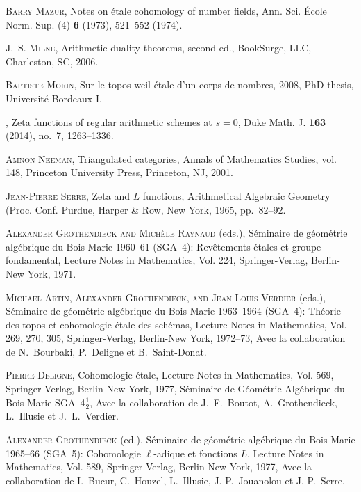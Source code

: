 \documentclass[leqno,12pt]{article}
\theoremstyle{plain}
\theoremstyle{definition}
\begin{document}
\begin{thebibliography}{99}
\textsc{Barry Mazur}, Notes on \'{e}tale cohomology of number fields, Ann. Sci.
  \'{E}cole Norm. Sup. (4) \textbf{6} (1973), 521--552 (1974).

\textsc{J.~S. Milne}, Arithmetic duality theorems, second ed., BookSurge, LLC,
  Charleston, SC, 2006.

\textsc{Baptiste Morin}, Sur le topos weil-\'{e}tale d'un corps de nombres, 2008,
  {PhD} thesis, {U}niversit\'{e} {B}ordeaux {I}.

\bysame, Zeta functions of regular arithmetic schemes at {$s=0$}, Duke
  Math. J. \textbf{163} (2014), no.~7, 1263--1336.

\textsc{Amnon Neeman}, Triangulated categories, Annals of Mathematics Studies,
  vol. 148, Princeton University Press, Princeton, NJ, 2001.

\textsc{Jean-Pierre Serre}, Zeta and {$L$} functions, Arithmetical {A}lgebraic
  {G}eometry ({P}roc. {C}onf. {P}urdue, Harper \& Row, New York, 1965,
  pp.~82--92.

\textsc{Alexander Grothendieck and Mich\`ele Raynaud} (eds.), S{\'e}minaire de
  g{\'e}om{\'e}trie alg{\'e}brique du {B}ois-{M}arie 1960--61 ({SGA}~4):
  Rev\^etements \'etales et groupe fondamental, Lecture Notes in Mathematics,
  Vol. 224, Springer-Verlag, Berlin-New York, 1971.

\textsc{Michael Artin, Alexander Grothendieck, and Jean-Louis Verdier} (eds.),
  S{\'e}minaire de g{\'e}om{\'e}trie alg{\'e}brique du {B}ois-{M}arie
  1963--1964 ({SGA}~4): {T}h\'eorie des topos et cohomologie \'etale des
  sch\'emas, Lecture Notes in Mathematics, Vol. 269, 270, 305,
  Springer-Verlag, Berlin-New York, 1972--73, Avec la collaboration de
  {N}.~{B}ourbaki, {P}.~{D}eligne et {B}.~{S}aint-{D}onat.

\textsc{Pierre Deligne}, Cohomologie \'etale, Lecture Notes in Mathematics, Vol.
  569, Springer-Verlag, Berlin-New York, 1977, S{\'e}minaire de
  G{\'e}om{\'e}trie Alg{\'e}brique du {B}ois-{M}arie {SGA}~4$\frac{1}{2}$, Avec
  la collaboration de {J}.~{F}.~{B}outot, {A}.~{G}rothendieck, {L}.~Illusie et
  {J}.~{L}.~{V}erdier.

\textsc{Alexander Grothendieck} (ed.), S{\'e}minaire de g{\'e}om{\'e}trie
  alg{\'e}brique du {B}ois-{M}arie 1965--66 ({SGA}~5): {C}ohomologie
  $\ell$-adique et fonctions {$L$}, Lecture Notes in Mathematics, Vol. 589,
  Springer-Verlag, Berlin-New York, 1977, Avec la collaboration de I.~Bucur,
  C.~Houzel, L.~Illusie, J.-P.~Jouanolou et J.-P.~Serre.


\end{thebibliography}
\end{document}
